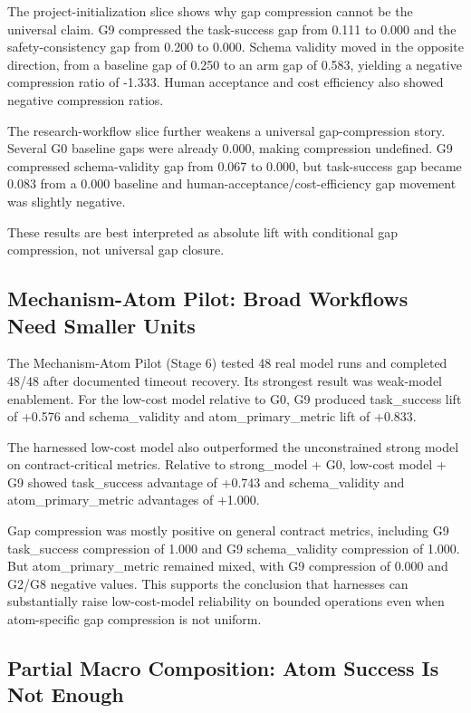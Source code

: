 \documentclass[11pt]{article}
\begin{document}
The project-initialization slice shows why gap compression cannot be the universal claim. G9 compressed the task-success gap from 0.111 to 0.000 and the safety-consistency gap from 0.200 to 0.000. Schema validity moved in the opposite direction, from a baseline gap of 0.250 to an arm gap of 0.583, yielding a negative compression ratio of -1.333. Human acceptance and cost efficiency also showed negative compression ratios.

The research-workflow slice further weakens a universal gap-compression story. Several G0 baseline gaps were already 0.000, making compression undefined. G9 compressed schema-validity gap from 0.067 to 0.000, but task-success gap became 0.083 from a 0.000 baseline and human-acceptance/cost-efficiency gap movement was slightly negative.

These results are best interpreted as absolute lift with conditional gap compression, not universal gap closure.

\subsection{Mechanism-Atom Pilot: Broad Workflows Need Smaller Units}

The Mechanism-Atom Pilot (Stage 6) tested 48 real model runs and completed 48/48 after documented timeout recovery. Its strongest result was weak-model enablement. For the low-cost model relative to G0, G9 produced task\_success lift of +0.576 and schema\_validity and atom\_primary\_metric lift of +0.833.

The harnessed low-cost model also outperformed the unconstrained strong model on contract-critical metrics. Relative to strong\_model + G0, low-cost model + G9 showed task\_success advantage of +0.743 and schema\_validity and atom\_primary\_metric advantages of +1.000.

Gap compression was mostly positive on general contract metrics, including G9 task\_success compression of 1.000 and G9 schema\_validity compression of 1.000. But atom\_primary\_metric remained mixed, with G9 compression of 0.000 and G2/G8 negative values. This supports the conclusion that harnesses can substantially raise low-cost-model reliability on bounded operations even when atom-specific gap compression is not uniform.

\subsection{Partial Macro Composition: Atom Success Is Not Enough}
\end{document}
